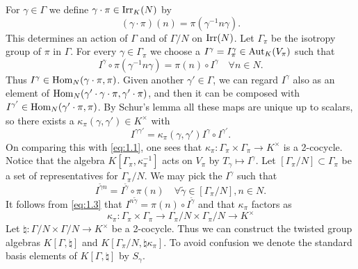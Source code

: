 \documentclass[11pt]{amsart}
\theoremstyle{definition}
\def\Hom{{\rm Hom}}
\def\Irr{{\rm Irr}}
\def\Aut{{\rm Aut}}
\begin{document}
For $\gamma \in \Gamma$ we define $\gamma \cdot \pi \in \Irr_K (N)$ by
\begin{equation}\label{eq:1.8}
(\gamma \cdot \pi) (n) = \pi (\gamma^{-1} n \gamma) . 
\end{equation}
This determines an action of $\Gamma$ and of $\Gamma / N$ on $\Irr (N)$. Let
$\Gamma_\pi$ be the isotropy group of $\pi$ in $\Gamma$. For every $\gamma \in 
\Gamma_\pi$ we choose a $I^\gamma = I^\gamma_\pi \in \Aut_K (V_\pi)$ such that
\begin{equation}\label{eq:1.3}
I^\gamma \circ \pi (\gamma^{-1} n \gamma) = \pi (n) \circ I^\gamma
\quad \forall n \in N .
\end{equation}
Thus $I^\gamma \in \Hom_N (\gamma \cdot \pi,\pi)$. Given another 
$\gamma' \in \Gamma$, we can regard $I^\gamma$ also as an element of 
$\Hom_N (\gamma' \cdot \gamma \cdot \pi, \gamma' \cdot \pi)$, and then it can be 
composed with $I^{\gamma'} \in \Hom_N (\gamma' \cdot \pi,\pi)$. By Schur's lemma
all these maps are unique up to scalars, so there exists a 
$\kappa_\pi (\gamma,\gamma') \in K^\times$ with
\begin{equation}\label{eq:1.4}
I^{\gamma \gamma'} = \kappa_\pi (\gamma,\gamma') I^\gamma \circ I^{\gamma'} . 
\end{equation}
On comparing this with \eqref{eq:1.1}, one sees that $\kappa_\pi : \Gamma_\pi \times
\Gamma_\pi \to K^\times$ is a 2-cocycle. Notice that the algebra 
$K [\Gamma_\pi,\kappa_\pi^{-1}]$ acts on $V_\pi$ by $T_\gamma \mapsto I^\gamma$.
Let $[\Gamma_\pi / N] \subset \Gamma_\pi$ be a set of representatives for 
$\Gamma_\pi / N$. We may pick the $I^\gamma$ such that 
\begin{equation}\label{eq:1.7}
I^{\tilde \gamma n} = I^{\tilde \gamma} \circ \pi (n) \quad 
\forall \tilde \gamma \in [\Gamma_\pi / N] , n \in N .
\end{equation}
It follows from \eqref{eq:1.3} that $I^{n \tilde \gamma} = \pi (n) \circ 
I^{\tilde \gamma}$ and that $\kappa_\pi$ factors as
\[
\kappa_\pi : \Gamma_\pi \times \Gamma_\pi \to \Gamma_\pi /N \times
\Gamma_\pi / N \to K^\times
\]
Let $\natural : \Gamma / N \times \Gamma / N \to K^\times$ be a 2-cocycle. Thus 
we can construct the twisted group algebras $K[\Gamma,\natural]$
and $K[\Gamma_\pi / N,\natural \kappa_\pi]$. To avoid confusion we denote the
standard basis elements of $K[\Gamma,\natural]$ by $S_\gamma$.
\end{document}
